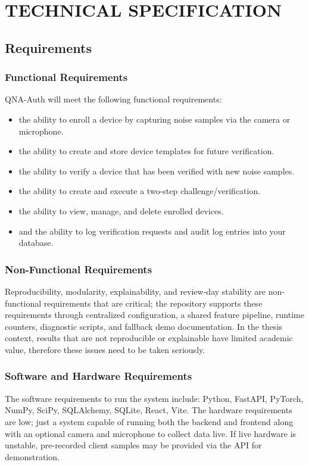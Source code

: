 \chapter{\MakeUppercase{Technical Specification}}
\section{Requirements}
\subsection{Functional Requirements}
QNA-Auth will meet the following functional requirements: 
\begin{itemize}
	\item the ability to enroll a device by capturing noise samples via the camera or microphone.
	\item the ability to create and store device templates for future verification.
	\item the ability to verify a device that has been verified with new noise samples.
	\item the ability to create and execute a two-step challenge/verification.
	\item the ability to view, manage, and delete enrolled devices.
	\item and the ability to log verification requests and audit log entries into your database.
\end{itemize}

\subsection{Non-Functional Requirements}
Reproducibility, modularity, explainability, and review-day stability are non-functional requirements that are critical; the repository supports these requirements through centralized configuration, a shared feature pipeline, runtime counters, diagnostic scripts, and fallback demo documentation. In the thesis context, results that are not reproducible or explainable have limited academic value, therefore these issues need to be taken seriously.

\subsection{Software and Hardware Requirements}
The software requirements to run the system include: Python, FastAPI, PyTorch, NumPy, SciPy, SQLAlchemy, SQLite, React, Vite. The hardware requirements are low; just a system capable of running both the backend and frontend along with an optional camera and microphone to collect data live. If live hardware is unstable, pre-recorded client samples may be provided via the API for demonstration.

